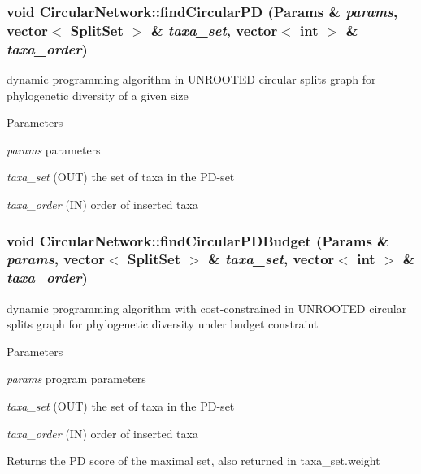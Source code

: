 \hypertarget{classCircularNetwork_a366581f42f10893f5a804073163e609c}{
\subsubsection[{findCircularPD}]{\setlength{\rightskip}{0pt plus 5cm}void CircularNetwork::findCircularPD ({\bf Params} \& {\em params}, \/  vector$<$ {\bf SplitSet} $>$ \& {\em taxa\_\-set}, \/  vector$<$ int $>$ \& {\em taxa\_\-order})}}
\label{classCircularNetwork_a366581f42f10893f5a804073163e609c}
dynamic programming algorithm in UNROOTED circular splits graph for phylogenetic diversity of a given size 
\begin{DoxyParams}{Parameters}
\item[{\em params}]parameters \item[{\em taxa\_\-set}](OUT) the set of taxa in the PD-\/set \item[{\em taxa\_\-order}](IN) order of inserted taxa \end{DoxyParams}
\hypertarget{classCircularNetwork_a5fe3bf80c02888d7cacf87a04c041651}{
\subsubsection[{findCircularPDBudget}]{\setlength{\rightskip}{0pt plus 5cm}void CircularNetwork::findCircularPDBudget ({\bf Params} \& {\em params}, \/  vector$<$ {\bf SplitSet} $>$ \& {\em taxa\_\-set}, \/  vector$<$ int $>$ \& {\em taxa\_\-order})}}
\label{classCircularNetwork_a5fe3bf80c02888d7cacf87a04c041651}
dynamic programming algorithm with cost-\/constrained in UNROOTED circular splits graph for phylogenetic diversity under budget constraint 
\begin{DoxyParams}{Parameters}
\item[{\em params}]program parameters \item[{\em taxa\_\-set}](OUT) the set of taxa in the PD-\/set \item[{\em taxa\_\-order}](IN) order of inserted taxa \end{DoxyParams}
\begin{DoxyReturn}{Returns}
the PD score of the maximal set, also returned in taxa\_\-set.weight 
\end{DoxyReturn}
